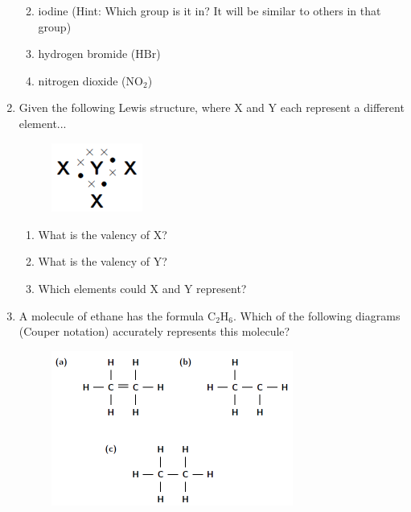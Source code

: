 \begin{enumerate}[noitemsep, label=\textbf{\arabic*}. ]
\begin{enumerate}[noitemsep, label=\textbf{\alph*}. ]
\label{m38689*uid177}\item iodine (Hint: Which group is it in? It will be similar to others in that group)
\label{m38689*uid178}\item hydrogen bromide ($\mathrm{HBr}$)
\label{m38689*uid179}\item nitrogen dioxide ($\mathrm{NO}{}_{2}$)
\end{enumerate}
                \label{m38689*uid180}\item Given the following Lewis structure, where X and Y each represent a different element...
    \setcounter{subfigure}{0}
	\begin{figure}[H] %
    \begin{center}
    \label{m38689*id148255!!!underscore!!!media}\label{m38689*id148255!!!underscore!!!printimage}\includegraphics[width=3cm]{col11305.imgs/m38689_CG11C1_027.png} %
      \vspace{2pt}
    \vspace{.1in}
    \end{center}
 \end{figure}       \label{m38689*id148261}\begin{enumerate}[noitemsep, label=\textbf{\alph*}. ] 
            \label{m38689*uid181}\item What is the valency of $\mathrm{X}$?
\label{m38689*uid182}\item What is the valency of $\mathrm{Y}$?
\label{m38689*uid183}\item Which elements could $\mathrm{X}$ and $\mathrm{Y}$ represent?
\end{enumerate}
                \label{m38689*uid184}\item A molecule of ethane has the formula $\mathrm{C}{}_{2}\mathrm{H}{}_{6}$. Which of the following diagrams (Couper notation) accurately represents this molecule?
    \setcounter{subfigure}{0}
	\begin{figure}[H] %
    \begin{center}
    \label{m38689*id148343!!!underscore!!!media}\label{m38689*id148343!!!underscore!!!printimage}\includegraphics[width=300px]{col11305.imgs/m38689_CG11C1_028.png} %

\end{center}
\end{figure}
\end{enumerate}
